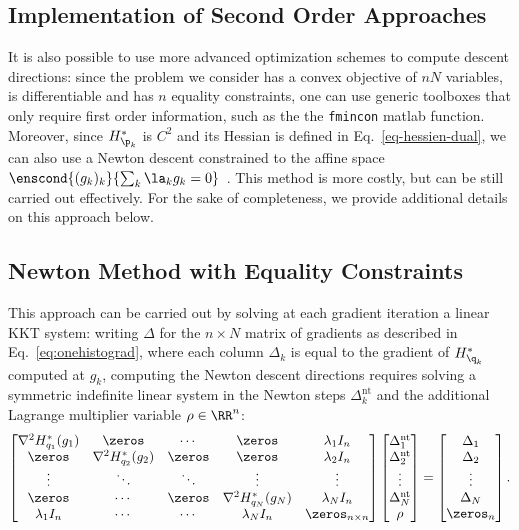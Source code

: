 
 \subsection{Implementation of Second Order Approaches}
 
 It is also possible to use more advanced optimization schemes to compute descent directions: since the problem we consider has a convex objective of $nN$ variables, is differentiable and has $n$ equality constraints, one can use generic toolboxes that only require first order information, such as the the \texttt{fmincon} matlab function. Moreover, since $H_{\p_k}^*$ is $C^2$ and its Hessian is defined in Eq.~\eqref{eq-hessien-dual}, we can also use a Newton descent constrained to the affine space $\enscond{ (g_k)_k }{ \sum_k \la_k g_k = 0 }$~\cite[\S10]{Boyd:1072}. This method is more costly, but can be still carried out effectively. For the sake of completeness, we provide additional details on this approach below.
 
 \subsection{Newton Method with Equality Constraints}
 
 This approach can be carried out by solving at each gradient iteration a linear KKT system: writing $\Delta$ for the $n\times N$ matrix of gradients as described in Eq.~\eqref{eq:onehistograd}, where each column $\Delta_k$ is equal to the gradient of $H^*_{\q_k}$ computed at $g_k$, computing the Newton descent directions requires solving a symmetric indefinite linear system in the Newton steps $\Delta_k^\text{nt}$ and the additional Lagrange multiplier variable $\rho \in \RR^n$:
 \begin{equation}\label{eq:newton}
 \begin{bmatrix} \nabla^2 H^*_{q_1}(g_1) & \zeros & \cdots & \zeros & \lambda_1 I_n \\ \zeros & \nabla^2 H^*_{q_2}(g_2) & \zeros & \zeros & \lambda_2 I_n \\ \vdots & \ddots& \ddots &  \vdots & \vdots \\ \zeros & \cdots & \zeros &   \nabla^2 H^*_{q_N}(g_N) & \lambda_N I_n \\\lambda_1 I_n & \cdots & \cdots & \lambda_N I_n & \zeros_{n\times n}\end{bmatrix} \begin{bmatrix}\Delta^{\text{nt}}_1 \\ \Delta^{\text{nt}}_2 \\ \vdots \\ \Delta^{\text{nt}}_N \\ \rho \end{bmatrix}= \begin{bmatrix}\Delta_1 \\ \Delta_2 \\ \vdots \\ \Delta_N \\ \zeros_n \end{bmatrix}.
 \end{equation}
 
